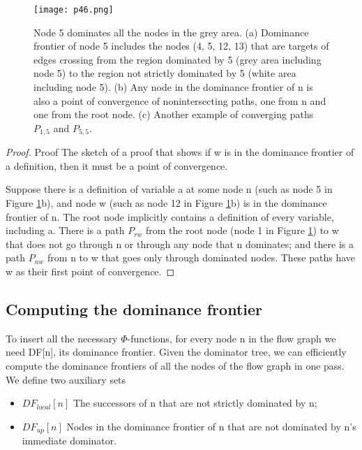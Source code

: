 \begin{figure}[htb]
    \centering
    \texttt{[image: p46.png]}
    \caption{Node 5 dominates all the nodes in the grey area. (a) Dominance frontier of node 5 includes the nodes (4, 5, 12, 13) that are targets of edges crossing from the region dominated by 5 (grey area including node 5) to the region not strictly dominated by 5 (white area including node 5). (b) Any node in the dominance frontier of n is also a point of convergence of nonintersecting paths, one from n and one from the root node. (c) Another example of converging paths $P_{1,5}$ and $P_{5,5}$.}
    \label{fig:p46}

\end{figure}


\begin{proof}{Proof}
The sketch of a proof that shows if w is in the dominance frontier of a definition, then it must be a point of convergence.

Suppose there is a definition of variable a at some node n (such as node 5 in Figure  \ref{fig:p46}b), and node w (such as node 12 in Figure  \ref{fig:p46}b) is in the dominance frontier of n. The root node implicitly contains a definition of every variable, including a. There is a path $P_{rw}$ from the root node (node 1 in Figure \ref{fig:p46}) to w that does not go through n or through any node that n dominates; and there is a path $P_{nw}$ from n to w that goes only through dominated nodes. These paths have w as their first point of convergence.
\end{proof}


\subsection{Computing the dominance frontier}

To insert all the necessary $\Phi$-functions, for every node n in the flow graph we need DF[n], its dominance frontier. Given the dominator tree, we can efficiently compute the dominance frontiers of all the nodes of the flow graph in one pass. We define two auxiliary sets

\begin{itemize}
    \item $DF_{local}[n]$ The successors of n that are not strictly dominated by n;
    \item $DF_{up}[n]$ Nodes in the dominance frontier of n that are not dominated by n’s immediate dominator.
\end{itemize}

